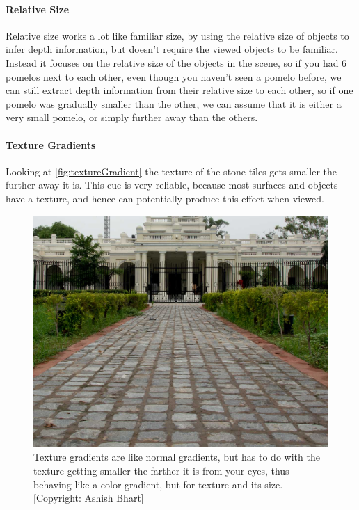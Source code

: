 			\paragraph{Relative Size}
				Relative size works a lot like familiar size, by using the relative size of objects to infer depth information, but doesn't require the viewed objects to be familiar. Instead it focuses on the relative size of the objects in the scene, so if you had 6 pomelos next to each other, even though you haven't seen a pomelo before, we can still extract depth information from their relative size to each other, so if one pomelo was gradually smaller than the other, we can assume that it is either a very small pomelo, or simply further away than the others.
			\paragraph{Texture Gradients}
				Looking at \autoref{fig:textureGradient} the texture of the stone tiles gets smaller the further away it is. This cue is very reliable, because most surfaces and objects have a texture, and hence can potentially produce this effect when viewed.
				\begin{figure}[H]
					\centering
					\includegraphics[width=0.6\linewidth]{figure/gradient}
					\caption{Texture gradients are like normal gradients, but has to do with the texture getting smaller the farther it is from your eyes, thus behaving like a color gradient, but for texture and its size. [Copyright: Ashish Bhart]}
					\label{fig:textureGradient}
				\end{figure}
